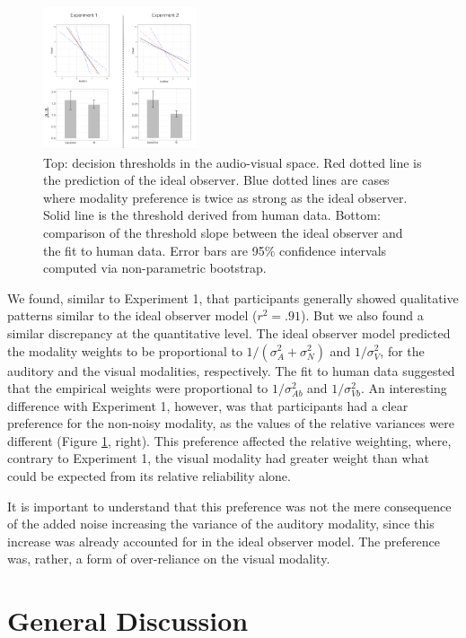 \documentclass[10pt,letterpaper]{article}
\begin{document}
\begin{figure}[h]
\centering
\includegraphics[width=0.4\textwidth]{preference.png}
\caption{Top: decision thresholds in the audio-visual space. Red dotted line is the prediction of the ideal observer. Blue dotted lines are cases where modality preference is twice as strong as the ideal observer. Solid line is the threshold derived from human data. Bottom: comparison of the threshold slope between the ideal observer and the fit to human data. Error bars are 95\% confidence intervals computed via non-parametric bootstrap.}
\label{fig:pref}
\end{figure}

We found, similar to Experiment 1, that participants generally showed qualitative patterns similar to the ideal observer model ($r^2 = .91$). But we also found a similar discrepancy at the quantitative level. The ideal observer model predicted the modality weights to be proportional to $1/(\sigma^2_{A}+\sigma^2_{N})$ and $1/\sigma^2_{V}$, for the auditory and the visual modalities, respectively. The fit to human data suggested that the empirical weights were proportional to $1/\sigma^2_{Ab}$ and $1/\sigma^2_{Vb}$. An interesting difference with Experiment 1, however, was that participants had a clear preference for the non-noisy modality, as the values of the relative variances were different (Figure \ref{fig:pref}, right). This preference affected the relative weighting, where, contrary to Experiment 1, the visual modality had greater weight than what could be expected from its relative reliability alone.


It is important to understand that this preference was not the mere consequence of the added noise increasing the variance of the auditory modality, since this increase was already accounted for in the ideal observer model. The preference was, rather, a form of over-reliance on the visual modality.

\section{General Discussion}
\end{document}
